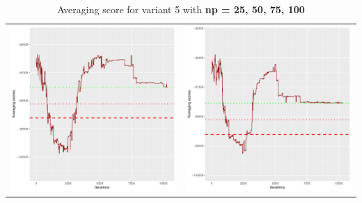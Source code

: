 \documentclass[]{scrartcl}
\begin{document}
\begin{table}[h!]
\begin{tabular}{cc}
\includegraphics[scale = 0.4]{./figs/hepar2/v5/75/avgBoundsEvolution-10352.pdf} & 
\includegraphics[scale = 0.4]{./figs/hepar2/v5/100/avgBoundsEvolution-10352.pdf} \\
\end{tabular}
\caption{Averaging score for variant 5 with \textbf{np =  25, 50, 75, 100 }}
\end{table}
\end{document}
